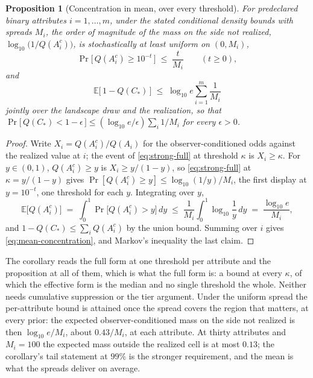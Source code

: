 \documentclass[11pt]{article}
\newtheorem{proposition}{Proposition}
\theoremstyle{definition}
\begin{document}
\begin{proposition}[Concentration in mean, over every threshold]
\label{prop:mean-concentration}
For predeclared binary attributes $i = 1, \ldots, m$, under the stated conditional density bounds with spreads $M_i$, the order of magnitude of the mass on the side not realized, $\log_{10}\big(1/Q(A_i^{c})\big)$, is stochastically at least uniform on $(0, M_i)$,
\[ \Pr\big[\, Q(A_i^{c}) \ge 10^{-t} \,\big] \;\le\; \frac{t}{M_i} \qquad (t \ge 0), \]
and
\begin{equation}
\label{eq:mean-concentration}
\mathbb{E}\big[\, 1 - Q(C_\ast) \,\big] \;\le\; \log_{10} e \sum_{i=1}^{m} \frac{1}{M_i}
\end{equation}
jointly over the landscape draw and the realization, so that $\Pr\big[\, Q(C_\ast) < 1 - \epsilon \,\big] \le (\log_{10} e/\epsilon) \sum_i 1/M_i$ for every $\epsilon > 0$.
\end{proposition}
\begin{proof}
Write $X_i = Q(A_i^{c})/Q(A_i)$ for the observer-conditioned odds against the realized value at $i$; the event of \eqref{eq:strong-full} at threshold $\kappa$ is $X_i \ge \kappa$. For $y \in (0,1)$, $Q(A_i^{c}) \ge y$ is $X_i \ge y/(1-y)$, so \eqref{eq:strong-full} at $\kappa = y/(1-y)$ gives $\Pr[Q(A_i^{c}) \ge y] \le \log_{10}(1/y)/M_i$, the first display at $y = 10^{-t}$, one threshold for each $y$. Integrating over $y$,
\[ \mathbb{E}\big[Q(A_i^{c})\big] \;=\; \int_0^1 \Pr\big[Q(A_i^{c}) > y\big]\, dy \;\le\; \frac{1}{M_i}\int_0^1 \log_{10}\frac{1}{y}\, dy \;=\; \frac{\log_{10} e}{M_i}, \]
and $1 - Q(C_\ast) \le \sum_i Q(A_i^{c})$ by the union bound. Summing over $i$ gives \eqref{eq:mean-concentration}, and Markov's inequality the last claim.
\end{proof}

\noindent The corollary reads the full form at one threshold per attribute and the proposition at all of them, which is what the full form is: a bound at every $\kappa$, of which the effective form is the median and no single threshold the whole. Neither needs cumulative suppression or the tier argument. Under the uniform spread the per-attribute bound is attained once the spread covers the region that matters, at every prior: the expected observer-conditioned mass on the side not realized is then $\log_{10} e/M_i$, about $0.43/M_i$, at each attribute. At thirty attributes and $M_i = 100$ the expected mass outside the realized cell is at most $0.13$; the corollary's tail statement at $99\%$ is the stronger requirement, and the mean is what the spreads deliver on average.
\end{document}
